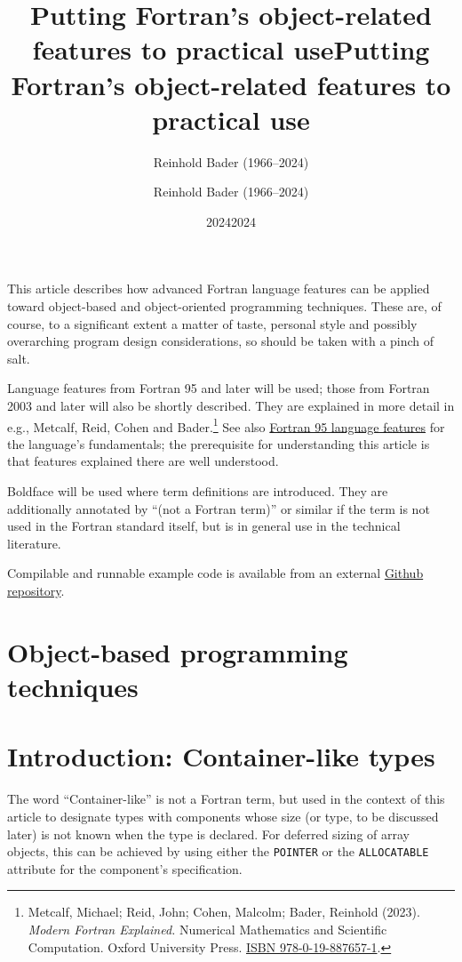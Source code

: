 \documentclass[
  paper=a4,
  ,captions=tableheading
]{scrartcl}
\title{Putting Fortran's object-related features to practical use}
\author{Reinhold Bader (1966--2024)}
\date{2024}
\title{Putting Fortran's object-related features to practical use}
\author{Reinhold Bader (1966--2024)}
\date{2024}
\begin{document}




{
\hypersetup{linkcolor=}
\setcounter{tocdepth}{3}
\tableofcontents
}
This article describes how advanced Fortran language features can be
applied toward object-based and object-oriented programming techniques.
These are, of course, to a significant extent a matter of taste,
personal style and possibly overarching program design considerations,
so should be taken with a pinch of salt.

Language features from Fortran 95 and later will be used; those from
Fortran 2003 and later will also be shortly described. They are
explained in more detail in e.g., Metcalf, Reid, Cohen and
Bader.\footnote{Metcalf, Michael; Reid, John; Cohen, Malcolm; Bader,
  Reinhold (2023). \emph{Modern Fortran Explained.} Numerical
  Mathematics and Scientific Computation. Oxford University Press.
  \href{https://en.wikipedia.org/wiki/Special:BookSources/978-0-19-887657-1}{ISBN
  978-0-19-887657-1}.} See also
\href{https://en.wikipedia.org/wiki/Fortran_95_language_features}{Fortran
95 language features} for the language's fundamentals; the prerequisite
for understanding this article is that features explained there are well
understood.

Boldface will be used where term definitions are introduced. They are
additionally annotated by ``(not a Fortran term)'' or similar if the
term is not used in the Fortran standard itself, but is in general use
in the technical literature.

Compilable and runnable example code is available from an external
\href{https://github.com/reinh-bader/object_fortran}{Github repository}.

\section{Object-based programming techniques}\label{sec:oop_techniques}

\section{Introduction: Container-like
types}\label{introduction-container-like-types}

The word ``Container-like'' is not a Fortran term, but used in the
context of this article to designate types with components whose size
(or type, to be discussed later) is not known when the type is declared.
For deferred sizing of array objects, this can be achieved by using
either the \texttt{POINTER} or the \texttt{ALLOCATABLE} attribute for
the component's specification.
\end{document}
